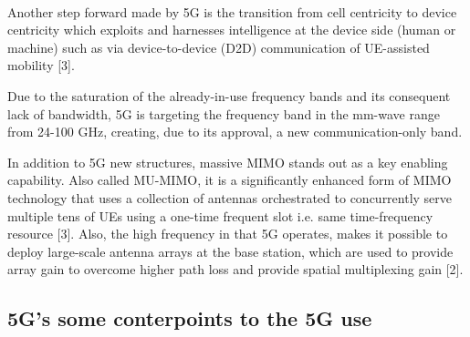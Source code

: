 \documentclass[10pt,journal,compsoc]{IEEEtran}
\begin{document}
\paragraph{}
Another step forward made by 5G is the transition from cell centricity to device centricity which exploits and harnesses intelligence at the device side (human or machine) such as via device-to-device (D2D) communication of UE-assisted mobility [3].\par
Due to the saturation of the already-in-use frequency bands and its consequent lack of bandwidth, 5G is targeting the frequency band in the mm-wave range from 24-100 GHz, creating, due to its approval, a new communication-only band.\par
In addition to 5G new structures, massive MIMO stands out as a key enabling capability. Also called MU-MIMO, it is a significantly enhanced form of MIMO technology that uses a collection of antennas orchestrated to concurrently serve multiple tens of UEs using a one-time frequent slot i.e. same time-frequency resource [3]. Also, the high frequency in that 5G operates, makes it possible to deploy large-scale antenna arrays at the base station, which are used to provide array gain to overcome higher path loss and provide spatial multiplexing gain [2].\par
\subsection*{5G's some conterpoints to the 5G use}
\end{document}
